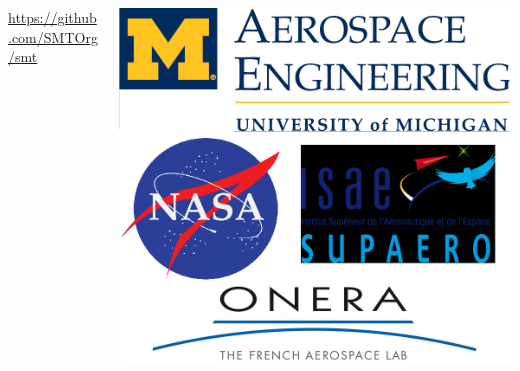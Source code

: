 \documentclass{beamer}
\theoremstyle{remark}
\theoremstyle{plain}
\begin{document}
\begin{frame}
\begin{columns}
\begin{column}{0.75\linewidth}
    \url{https://github.com/SMTOrg/smt}
    \end{column}
    \begin{column}{0.25\linewidth}
    \includegraphics[width=0.8\linewidth]{images/logosmt}
    \end{column}
    \end{columns}
\end{frame}
\end{document}
